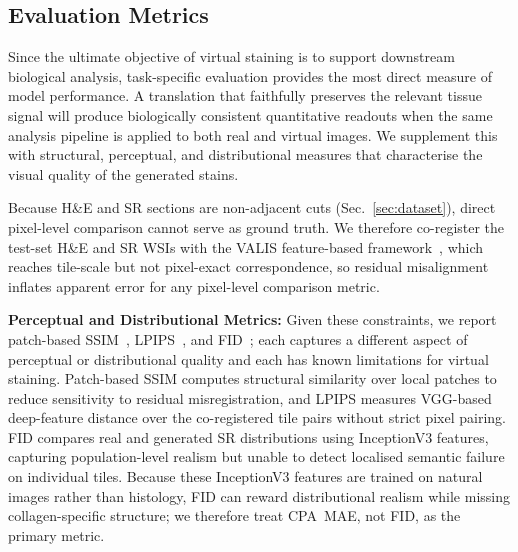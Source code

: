 
\subsection{Evaluation Metrics}
\label{sec:metrics}

Since the ultimate objective of virtual staining is to support downstream biological
analysis, task-specific evaluation provides the most direct measure of model performance.
A translation that faithfully preserves the relevant tissue signal will produce
biologically consistent quantitative readouts when the same analysis pipeline is applied
to both real and virtual images.
We supplement this with structural, perceptual, and distributional measures that
characterise the visual quality of the generated stains.

Because H\&E and SR sections are non-adjacent cuts (Sec.~\ref{sec:dataset}), direct
pixel-level comparison cannot serve as ground truth.
We therefore co-register the test-set H\&E and SR WSIs with the VALIS feature-based
framework~\cite{gatenbee2023virtual}, which reaches tile-scale but not pixel-exact
correspondence, so residual misalignment inflates apparent error for any pixel-level
comparison metric.

\noindent\textbf{Perceptual and Distributional Metrics:} Given these constraints, we report patch-based SSIM~\cite{wang2004ssim},
LPIPS~\cite{zhang2018lpips}, and FID~\cite{heusel2017fid}; each captures a different
aspect of perceptual or distributional quality and each has known limitations for
virtual staining.
Patch-based SSIM computes structural similarity over local patches to reduce
sensitivity to residual misregistration, and LPIPS measures VGG-based deep-feature
distance over the co-registered tile pairs without strict pixel pairing.
FID compares real and generated SR distributions using InceptionV3 features, capturing
population-level realism but unable to detect localised semantic failure on individual
tiles.
Because these InceptionV3 features are trained on natural images rather than histology,
FID can reward distributional realism while missing collagen-specific structure; we
therefore treat CPA~MAE, not FID, as the primary metric.

